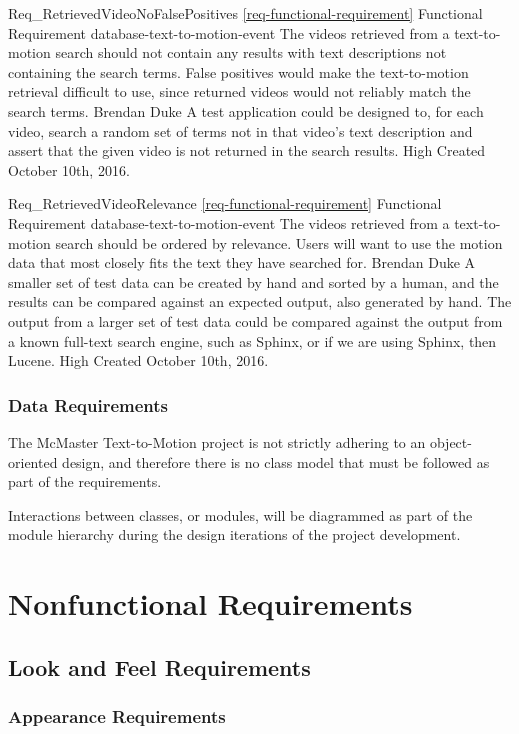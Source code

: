 \documentclass{scrreprt}
\begin{document}
\requirement
{Req_RetrievedVideoNoFalsePositives}
{\ref{req-functional-requirement} Functional Requirement}
{database-text-to-motion-event}
{The videos retrieved from a text-to-motion search should not contain any
 results with text descriptions not containing the search terms.}
{False positives would make the text-to-motion retrieval difficult to use,
 since returned videos would not reliably match the search terms.}
{Brendan Duke}
{A test application could be designed to, for each video, search a random set
 of terms not in that video's text description and assert that the given video
 is not returned in the search results.}
{High}
{Created October 10th, 2016.}

\requirement
{Req_RetrievedVideoRelevance}
{\ref{req-functional-requirement} Functional Requirement}
{database-text-to-motion-event}
{The videos retrieved from a text-to-motion search should be ordered by relevance.}
{Users will want to use the motion data that most closely fits the text they
 have searched for.}
{Brendan Duke}
{A smaller set of test data can be created by hand and sorted by a human, and
 the results can be compared against an expected output, also generated by hand.
 The output from a larger set of test data could be compared against the output
 from a known full-text search engine, such as Sphinx, or if we are using
 Sphinx, then Lucene.}
{High}
{Created October 10th, 2016.}

\subsection{Data Requirements}

The McMaster Text-to-Motion project is not strictly adhering to an
object-oriented design, and therefore there is no class model that must be
followed as part of the requirements.

Interactions between classes, or modules, will be diagrammed as part of the
module hierarchy during the design iterations of the project development.

\chapter{Nonfunctional Requirements}

\section{Look and Feel Requirements}

\subsection{Appearance Requirements}
\label{req-appearance}
\end{document}
